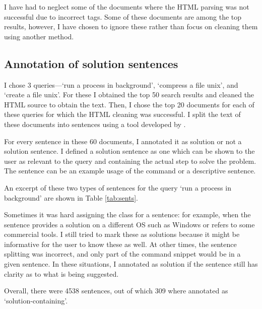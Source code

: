 \documentclass[11pt]{article}
\begin{document}
I have had to neglect some of the documents where the HTML parsing
was not successful due to incorrect tags. Some of these documents are among the
top results, however, I have chosen to ignore these rather than focus on cleaning
them using another method.

\subsection{Annotation of solution sentences}
I chose 3 queries---`run a process in background', `compress a file unix', and
`create a file unix'. For these I obtained the top 50 search results and cleaned
the HTML source to obtain the text. Then, I chose the top 20 documents for each 
of these queries for which the HTML cleaning was successful. I split the text of these
documents into sentences using a tool developed by . 
 

For every sentence in
these 60 documents, I annotated it as solution or not a solution sentence. I defined
a solution sentence as one which can be shown to the user as relevant to the query and
containing the actual step to solve the problem. The sentence can be an example usage of the
command or a descriptive sentence. 


An excerpt of these two types of sentences for the query `run a process in background'
are shown in Table \ref{tab:sents}.


Sometimes it was hard assigning the class for a sentence: 
for example, when the sentence provides a solution
on a different OS such as Windows or refers to some commercial tools. I still tried to
mark these as solutions because it might be informative for the user to know these as well.
At other times, the sentence splitting was incorrect, and only part of the command snippet
would be in a given sentence. In these situations, I annotated as solution if the sentence
still has clarity as to what is being suggested.

Overall, there were 4538 sentences, out of which 309 where annotated as `solution-containing'.
\end{document}
